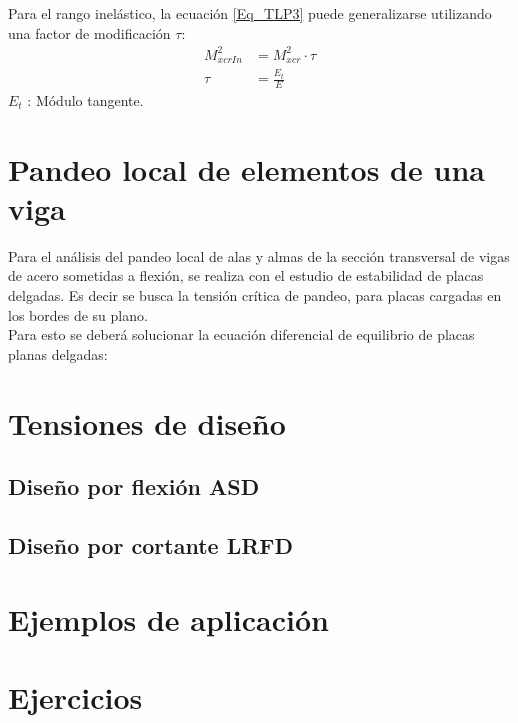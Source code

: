 Para el rango inelástico, la ecuación \ref{Eq_TLP3} puede generalizarse utilizando una factor de modificación $\tau$:
\begin{align}
    M_{xcrIn}^2 &= M_{xcr}^2\cdot\tau\\
    \tau &= \frac{E_t}{E}
\end{align}
$E_t$ : Módulo tangente.
\section{Pandeo local de elementos de una viga}
Para el análisis del pandeo local de alas y almas de la sección transversal de vigas de acero sometidas a flexión, se realiza con el estudio de estabilidad de placas delgadas. Es decir se busca la tensión crítica de pandeo, para placas cargadas en los bordes de su plano.\\
Para esto se deberá solucionar la ecuación diferencial de equilibrio de placas planas delgadas:
\section{Tensiones de diseño}
\subsection{Diseño por flexión ASD}
\subsection{Diseño por cortante LRFD}
\section{Ejemplos de aplicación}
\section{Ejercicios}
